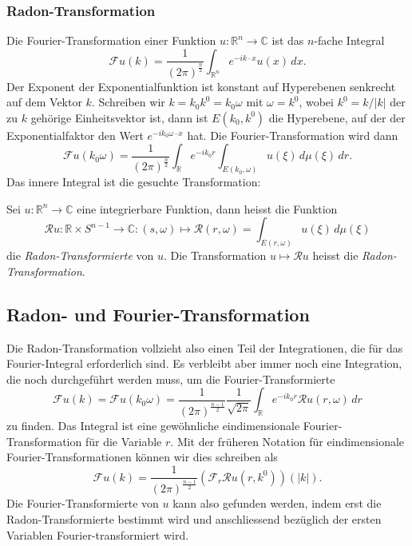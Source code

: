 %
%
\subsubsection{Radon-Transformation}
Die Fourier-Transformation einer Funktion $u\colon \mathbb{R}^n\to\mathbb{C}$
ist das $n$-fache Integral
\[
\mathscr{F}u(k)
=
\frac{1}{(2\pi)^{\frac{n}2}}
\int_{\mathbb{R}^n}
e^{-ik\cdot x} u(x)\,dx.
\]
Der Exponent der Exponentialfunktion ist konstant auf Hyperebenen senkrecht
auf dem Vektor $k$.
Schreiben wir $k=k_0k^0=k_0\omega$ mit $\omega=k^0$, wobei $k^0=k/|k|$ der
zu $k$ gehörige Einheitsvektor ist, dann ist 
$E(k_0,k^0)$ die Hyperebene, auf der der Exponentialfaktor den
Wert $e^{-ik_0\omega\cdot x}$ hat.
Die Fourier-Transformation wird dann
\[
\mathscr{F}u(k_0\omega)
=
\frac{1}{(2\pi)^{\frac{n}2}}
\int_{\mathbb{R}}
e^{-ik_0r}
\int_{E(k_0,\omega)}
u(\xi)
\,d\mu(\xi)
\,dr.
\]
Das innere Integral ist die gesuchte Transformation:

\begin{definition}
Sei $u\colon\mathbb{R}^n\to\mathbb{C}$ eine integrierbare Funktion,
dann heisst die Funktion
\[
\mathscr{R}u
\colon
\mathbb{R}\times S^{n-1}
\to
\mathbb{C}
:
(s,\omega)
\mapsto
\mathscr{R}(r,\omega)
=
\int_{E(r,\omega)} u(\xi) \,d\mu(\xi)
\]
die {\em Radon-Transformierte} von $u$.
%
Die Transformation $u\mapsto \mathscr{R}u$ heisst die
{\em Radon-Transformation}.
%
\end{definition}

%
%
\subsection{Radon- und Fourier-Transformation
\label{buch:radon:definition:subsection:radonfourier}}
Die Radon-Transformation vollzieht also einen Teil der Integrationen,
die für das Fourier-Integral erforderlich sind.
Es verbleibt aber immer noch eine Integration, die noch
durchgeführt werden muss, um die Fourier-Transformierte
\[
\mathscr{F}u(k)
=
\mathscr{F}u(k_0\omega)
=
\frac{1}{(2\pi)^{\frac{n-1}2}}
\frac{1}{\!\sqrt{2\pi}}
\int_{\mathbb{R}}
e^{-ik_0r}
\mathscr{R}u(r,\omega)\,dr
\]
zu finden.
Das Integral ist eine gewöhnliche eindimensionale Fourier-Transformation
für die Variable $r$.
Mit der früheren Notation für eindimensionale Fourier-Transformationen
können wir dies schreiben als
\begin{equation}
\mathscr{F}u(k)
=
\frac{1}{(2\pi)^{\frac{n-1}2}}
(\mathscr{F}_r \mathscr{R}u(r,k^0))(|k|).
\label{buch:radon:definitionb:eqn:fr}
\end{equation}
Die Fourier-Transformierte von $u$ kann also gefunden werden,
indem erst die Radon-Transformierte bestimmt wird und anschliessend
bezüglich der ersten Variablen Fourier-transformiert wird.

